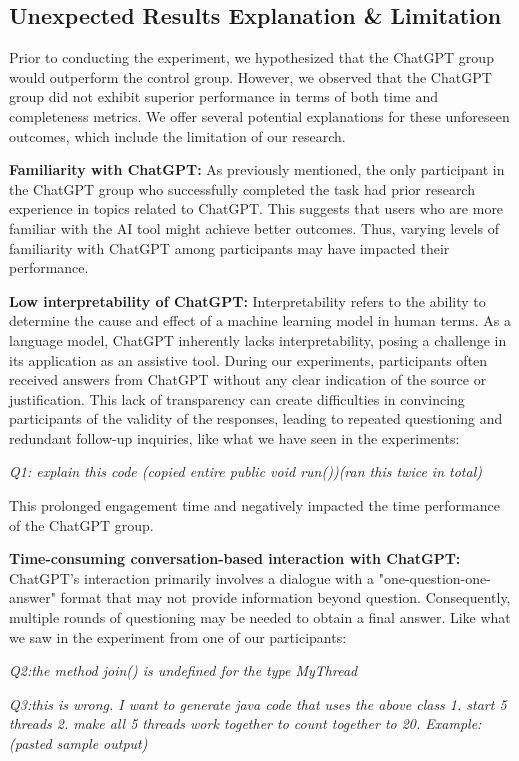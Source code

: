 \documentclass[manuscript,screen,nonacm]{acmart}
\begin{document}
\subsection{Unexpected Results Explanation \& Limitation}\label{Unexpected}
Prior to conducting the experiment, we hypothesized that the ChatGPT group would outperform the control group. However, we observed that the ChatGPT group did not exhibit superior performance in terms of both time and completeness metrics. We offer several potential explanations for these unforeseen outcomes, which include the limitation of our research.

\textbf{Familiarity with ChatGPT:} As previously mentioned, the only participant in the ChatGPT group who successfully completed the task had prior research experience in topics related to ChatGPT. This suggests that users who are more familiar with the AI tool might achieve better outcomes. Thus, varying levels of familiarity with ChatGPT among participants may have impacted their performance.

\textbf{Low interpretability of ChatGPT:} Interpretability refers to the ability to determine the cause and effect of a machine learning model in human terms. As a language model, ChatGPT inherently lacks interpretability, posing a challenge in its application as an assistive tool. During our experiments, participants often received answers from ChatGPT without any clear indication of the source or justification. This lack of transparency can create difficulties in convincing participants of the validity of the responses, leading to repeated questioning and redundant follow-up inquiries, like what we have seen in the experiments:

\textit{Q1: explain this code (copied entire public void run())(ran this twice in total)}

This prolonged engagement time and negatively impacted the time performance of the ChatGPT group.

\textbf{Time-consuming conversation-based interaction with ChatGPT:} ChatGPT's interaction primarily involves a dialogue with a "one-question-one-answer" format that may not provide information beyond question. Consequently, multiple rounds of questioning may be needed to obtain a final answer. Like what we saw in the experiment from one of our participants:

\textit{Q2:the method join() is undefined for the type MyThread}

\textit{Q3:this is wrong. I want to generate java code that uses the above class 1. start 5 threads 2. make all 5 threads work together to count together to 20. Example: (pasted sample output)}
 
\end{document}
